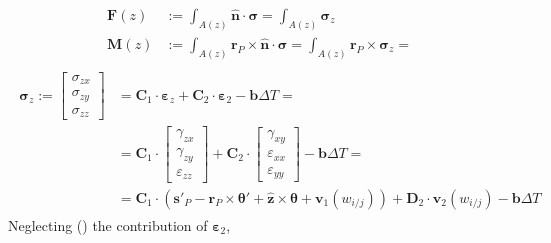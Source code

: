 \documentclass[letterpaper,10pt,english]{jupyterBook}
\begin{document}
\begin{equation*}
\begin{split}\begin{aligned}
  \mathbf{F}(z) & := \int_{A(z)} \hat{\mathbf{n}} \cdot \boldsymbol\sigma = \int_{A(z)} \boldsymbol{\sigma}_z \\
  \mathbf{M}(z) & := \int_{A(z)} \mathbf{r}_P \times \hat{\mathbf{n}} \cdot \boldsymbol\sigma = \int_{A(z)} \mathbf{r}_P \times \boldsymbol\sigma_z =
\end{aligned}\end{split}
\end{equation*}\begin{equation*}
\begin{split}\begin{aligned}
  \boldsymbol\sigma_z := \begin{bmatrix} \sigma_{zx} \\ \sigma_{zy} \\ \sigma_{zz} \end{bmatrix} 
  & = \mathbf{C}_1 \cdot \boldsymbol{\varepsilon}_z + \mathbf{C}_2 \cdot \boldsymbol{\varepsilon}_2 - \mathbf{b} \Delta T = \\
  & = \mathbf{C}_1 \cdot \begin{bmatrix} \gamma_{zx} \\ \gamma_{zy} \\ \varepsilon_{zz} \end{bmatrix} + \mathbf{C}_2 \cdot  \begin{bmatrix}  \gamma_{xy} \\ \varepsilon_{xx} \\ \varepsilon_{yy} \end{bmatrix} - \mathbf{b} \Delta T = \\ 
  & = \mathbf{C}_1 \cdot \left( \mathbf{s}'_{P} - \mathbf{r}_P \times \boldsymbol\theta' + \hat{\mathbf{z}} \times \boldsymbol\theta + \mathbf{v}_1(w_{i/j}) \right) + \mathbf{D}_2 \cdot \mathbf{v}_2(w_{i/j}) - \mathbf{b} \Delta T
\end{aligned}\end{split}
\end{equation*}
\sphinxAtStartPar
Neglecting () the contribution of \(\boldsymbol{\varepsilon}_2\),
\end{document}
